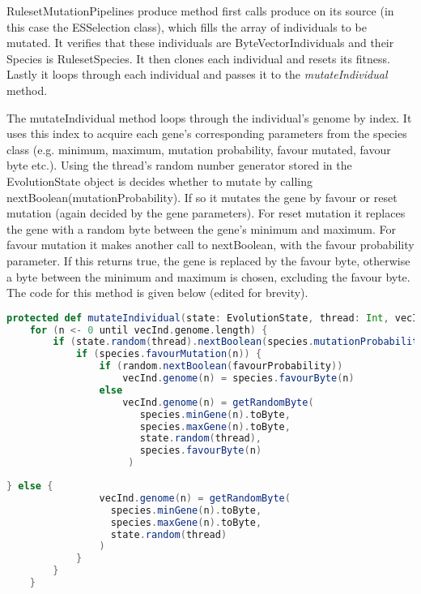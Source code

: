 RulesetMutationPipelines produce method first calls produce on its source (in this case the ESSelection class), which fills the array of individuals to be mutated. It verifies that these individuals are ByteVectorIndividuals and their Species is RulesetSpecies. It then clones each individual and resets its fitness. Lastly it loops through each individual and passes it to the \emph{mutateIndividual} method.

The mutateIndividual method loops through the individual's genome by index. It uses this index to acquire each gene's corresponding parameters from the species class (e.g. minimum, maximum, mutation probability, favour mutated, favour byte etc.). Using the thread's random number generator stored in the EvolutionState object is decides whether to mutate by calling {\ttfamily nextBoolean(mutationProbability)}. If so it mutates the gene by favour or reset mutation (again decided by the gene parameters). For reset mutation it replaces the gene with a random byte between the gene's minimum and maximum. For favour mutation it makes another call to nextBoolean, with the favour probability parameter. If this returns true, the gene is replaced by the favour byte, otherwise a byte between the minimum and maximum is chosen, excluding the favour byte. The code for this method is given below (edited for brevity).

\begin{minipage}{0.9\linewidth}
\centering
\begin{lstlisting}[language=scala]
protected def mutateIndividual(state: EvolutionState, thread: Int, vecInd: ByteVectorIndividual, species: RulesetSpecies): ByteVectorIndividual = {
    for (n <- 0 until vecInd.genome.length) {
        if (state.random(thread).nextBoolean(species.mutationProbability(n))) {
            if (species.favourMutation(n)) {
                if (random.nextBoolean(favourProbability))
                    vecInd.genome(n) = species.favourByte(n)
                else
                    vecInd.genome(n) = getRandomByte(
                       species.minGene(n).toByte,
                       species.maxGene(n).toByte,
                       state.random(thread),
                       species.favourByte(n)
                     )
\end{lstlisting}
\end{minipage}
                    
\begin{minipage}{0.9\linewidth}
\centering
\begin{lstlisting}[language=scala]
            } else {
                vecInd.genome(n) = getRandomByte(
                  species.minGene(n).toByte,
                  species.maxGene(n).toByte,
                  state.random(thread)
                )    
            }
        }
    }
\end{lstlisting}
\end{minipage}
                    
